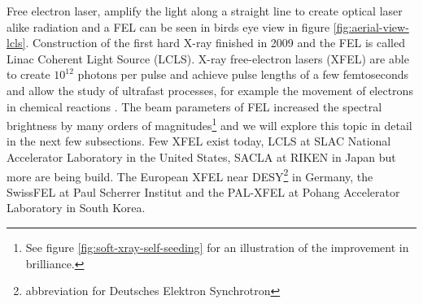 Free electron laser, amplify the light along a straight line to create optical laser alike radiation and a FEL can be seen in birds eye view in figure \ref{fig:aerial-view-lcls}. Construction of the first hard X-ray finished in 2009 and the FEL is called Linac Coherent Light Source (LCLS). X-ray free-electron lasers (XFEL) are able to create $10^12$ photons per pulse and achieve pulse lengths of a few femtoseconds and allow the study of ultrafast processes, for example the movement of electrons in chemical reactions \citep{Emma-2010-NatPho,Young-2010-Nature}. The beam parameters of FEL increased the spectral brightness by many orders of magnitudes\footnote{See figure \ref{fig:soft-xray-self-seeding} for an illustration of the improvement in brilliance.} and we will explore this topic in detail in the next few subsections. Few XFEL exist today, LCLS at SLAC National Accelerator Laboratory in the United States, SACLA at RIKEN in Japan but more are being build. The European XFEL near DESY\footnote{abbreviation for Deutsches Elektron Synchrotron} in Germany, the SwissFEL at Paul Scherrer Institut and the PAL-XFEL at Pohang Accelerator Laboratory in South Korea.
